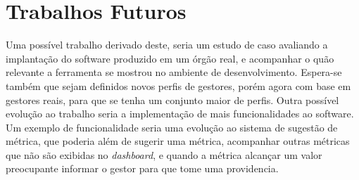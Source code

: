 \section{Trabalhos Futuros}
Uma possível trabalho derivado deste, seria um estudo de caso avaliando a implantação do software produzido em um órgão real, e acompanhar o quão relevante a ferramenta se mostrou no ambiente de desenvolvimento. Espera-se também que sejam definidos novos perfis de gestores, porém agora com base em gestores reais, para que se tenha um conjunto maior de perfis. Outra possível evolução ao trabalho seria a implementação de mais funcionalidades ao software. Um exemplo de funcionalidade seria uma evolução ao sistema de sugestão de métrica, que poderia além de sugerir uma métrica, acompanhar outras métricas que não são exibidas no \textit{dashboard}, e quando a métrica alcançar um valor preocupante informar o gestor para que tome uma providencia.